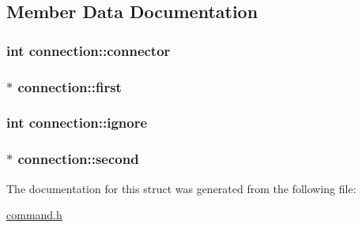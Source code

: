 \subsection{Member Data Documentation}
\subsubsection[{\texorpdfstring{connector}{connector}}]{\setlength{\rightskip}{0pt plus 5cm}int connection\+::connector}\hypertarget{structconnection_a07879bb1744b9d358c5042cd08ef8570}{}\label{structconnection_a07879bb1744b9d358c5042cd08ef8570}
\subsubsection[{\texorpdfstring{first}{first}}]{$\ast$ connection\+::first}\hypertarget{structconnection_a63a41b4deafe124ccd4b50c6767c1945}{}\label{structconnection_a63a41b4deafe124ccd4b50c6767c1945}
\subsubsection[{\texorpdfstring{ignore}{ignore}}]{\setlength{\rightskip}{0pt plus 5cm}int connection\+::ignore}\hypertarget{structconnection_a5457e2643b42913b65e75ae6aadc4af6}{}\label{structconnection_a5457e2643b42913b65e75ae6aadc4af6}
\subsubsection[{\texorpdfstring{second}{second}}]{$\ast$ connection\+::second}\hypertarget{structconnection_a3abadad2499f8d84171526134c8a2ce1}{}\label{structconnection_a3abadad2499f8d84171526134c8a2ce1}


The documentation for this struct was generated from the following file\+:\begin{DoxyCompactItemize}
\item 
\hyperlink{command_8h}{command.\+h}\end{DoxyCompactItemize}
